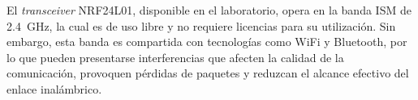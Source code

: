 El \textit{transceiver} NRF24L01, disponible en el laboratorio, opera en la banda ISM de \SI{2.4}{\giga\hertz}, la cual es de uso libre y no requiere licencias para su utilización.
Sin embargo, esta banda es compartida con tecnologías como WiFi y Bluetooth, por lo que pueden presentarse interferencias que afecten la calidad de la comunicación, provoquen pérdidas de paquetes y reduzcan el alcance efectivo del enlace inalámbrico.

